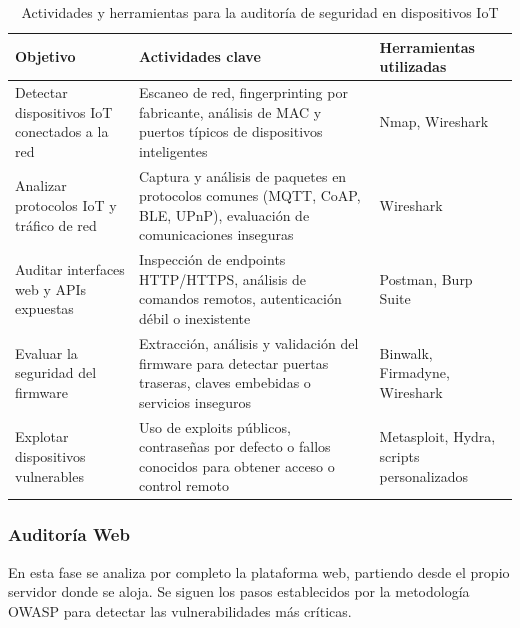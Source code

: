 \documentclass[a4paper, 11pt]{article}
\begin{document}
\begin{table}[H]
\centering
\renewcommand{\arraystretch}{1.4}
\begin{tabular}{|p{4.3cm}|p{7.2cm}|p{3.6cm}|}
\hline
\textbf{Objetivo} & \textbf{Actividades clave} & \textbf{Herramientas utilizadas} \\
\hline
Detectar dispositivos IoT conectados a la red & Escaneo de red, fingerprinting por fabricante, análisis de MAC y puertos típicos de dispositivos inteligentes & Nmap, Wireshark \\
\hline
Analizar protocolos IoT y tráfico de red & Captura y análisis de paquetes en protocolos comunes (MQTT, CoAP, BLE, UPnP), evaluación de comunicaciones inseguras & Wireshark \\
\hline
Auditar interfaces web y APIs expuestas & Inspección de endpoints HTTP/HTTPS, análisis de comandos remotos, autenticación débil o inexistente & Postman, Burp Suite \\
\hline
Evaluar la seguridad del firmware & Extracción, análisis y validación del firmware para detectar puertas traseras, claves embebidas o servicios inseguros & Binwalk, Firmadyne, Wireshark \\
\hline
Explotar dispositivos vulnerables & Uso de exploits públicos, contraseñas por defecto o fallos conocidos para obtener acceso o control remoto & Metasploit, Hydra, scripts personalizados \\
\hline
\end{tabular}
\caption{Actividades y herramientas para la auditoría de seguridad en dispositivos IoT}
\label{tab:seguridad_iot}
\end{table}


\subsubsection{Auditoría Web}

En esta fase se analiza por completo la plataforma web, partiendo desde el propio servidor donde se aloja. Se siguen los pasos establecidos por la metodología OWASP para detectar las vulnerabilidades más críticas.
\end{document}
